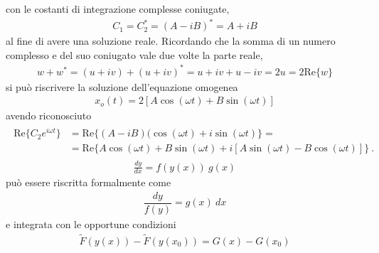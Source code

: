 \documentclass[letterpaper,10pt,english]{jupyterBook}
\begin{document}
\sphinxAtStartPar
con le costanti di integrazione complesse coniugate,
\begin{equation*}
\begin{split}C_1 = C_2^* = (A - i B)^* = A + i B\end{split}
\end{equation*}
\sphinxAtStartPar
al fine di avere una soluzione reale. Ricordando che la somma di un numero complesso e del suo coniugato vale due volte la parte reale,
\begin{equation*}
\begin{split}w + w^* = (u+iv) + (u+iv)^* = u+iv + u - i v = 2 u = 2 \text{Re}\{w\}\end{split}
\end{equation*}
\sphinxAtStartPar
si può riscrivere la soluzione dell’equazione omogenea
\begin{equation*}
\begin{split}x_o(t) = 2 \left[ A \cos ( \omega t ) + B \sin (\omega t ) \right] \end{split}
\end{equation*}
\sphinxAtStartPar
avendo riconosciuto
\begin{equation*}
\begin{split}\begin{aligned}
  \text{Re}\{C_2 e^{i \omega t}\} &= \text{Re}\{ (A - i B)(\cos(\omega t) + i \sin(\omega t)\} = \\
  & = \text{Re}\{ A \cos(\omega t) + B \sin (\omega t) + i \left[ A \sin (\omega t) - B \cos (\omega t) \right]\} \ .
\end{aligned}\end{split}
\end{equation*}
\sphinxAtStartPar
{}
\begin{equation*}
\begin{split}\frac{d y}{d x} = f(y(x)) \ g(x) \end{split}
\end{equation*}
\sphinxAtStartPar
può essere riscritta formalmente come
\begin{equation*}
\begin{split}\dfrac{dy}{f(y)} = g(x) \ d x \end{split}
\end{equation*}
\sphinxAtStartPar
e integrata con le opportune condizioni
\begin{equation*}
\begin{split}\tilde{F}(y(x)) - \tilde{F}(y(x_0)) = G(x) - G(x_0)\end{split}
\end{equation*}
\end{document}
